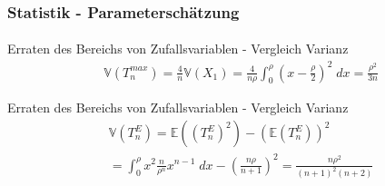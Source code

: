 \documentclass{beamer}
\begin{document}
\begin{frame}
    \frametitle{Statistik - Parameterschätzung}
\framesubtitle{}

\begin{block}{Erraten des Bereichs von Zufallsvariablen - Vergleich Varianz}
\begin{align*}
& \mathbb{V}(T_n^{max} ) = \frac{4}{n} \mathbb{V}(X_1)   =  \frac{4}{n \rho}   \int_{0}^{\rho } (x - \frac{\rho}{2})^2 \; dx = \frac{\rho^2}{3n}
\end{align*}
\end{block}
\begin{block}{Erraten des Bereichs von Zufallsvariablen - Vergleich Varianz}
\begin{align*}
& \mathbb{V}(T_n^{E} ) = \mathbb{E}((T_n^{E})^2 ) - (\mathbb{E}(T_n^{E} ))^2   \\
& = \int_{0}^{\rho} x^2 \frac{n}{\rho^n} x^{n- 1} \; dx - (\frac{n \rho}{n+1})^2 = \frac{n \rho^2}{(n+1)^2 (n+2)} 
\end{align*}
\end{block}
 \end{frame}
\end{document}
